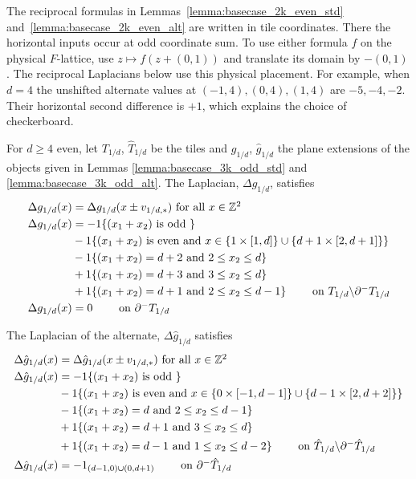 \documentclass[12pt]{amsart}
\begin{document}
The reciprocal formulas in Lemmas~\ref{lemma:basecase_2k_even_std} and~\ref{lemma:basecase_2k_even_alt} are written in tile coordinates. There the horizontal inputs occur at odd coordinate sum. To use either formula $f$ on the physical $F$-lattice, use $z\mapsto f(z+(0,1))$ and translate its domain by $-(0,1)$. The reciprocal Laplacians below use this physical placement. For example, when $d=4$ the unshifted alternate values at $(-1,4),(0,4),(1,4)$ are $-5,-4,-2$. Their horizontal second difference is $+1$, which explains the choice of checkerboard.

\begin{lemma} \label{lemma:doubled_staircase_laplacian}
	For $d \geq 4$ even, let $T_{1/d}$, $\hat{T}_{1/d}$ be the tiles and $g_{1/d}$, $\hat{g}_{1/d}$ the plane extensions of the objects given in Lemmas \ref{lemma:basecase_3k_odd_std} and \ref{lemma:basecase_3k_odd_alt}. The Laplacian, $\Delta g_{1/d}$, satisfies
	\begin{equation}
	\begin{aligned}
	\Delta g_{1/d}(x)  &=  \Delta g_{1/d}(x \pm v_{1/d, *})  \mbox{ for all $x \in \mathbb{Z}^2$} \\
	\Delta g_{1/d}(x) &= -1\{ (x_1+x_2) \mbox{ is odd } \} \\
	&  -1\{ (x_1+x_2) \mbox{ is even and $x \in \{1 \times [1,d]\} \cup \{d+1 \times [2, d+1] \}$} \} \\
	&  -1\{ (x_1 +x_2) = d+2  \mbox{ and $2 \leq x_2 \leq d$} \}\\
	&+ 1 \{ (x_1 + x_2) =d+3 \mbox{ and $3 \leq x_2 \leq d$} \} \\
	&+ 1 \{ (x_1 + x_2) =d+1 \mbox{ and $2 \leq x_2 \leq d-1$} \} \qquad \mbox{ on $T_{1/d} \backslash \partial^{-}T_{1/d}$} \\
	\Delta g_{1/d}(x) &= 0 \qquad \mbox{ on $\partial^{-}T_{1/d}$}
	\end{aligned}
	\end{equation}
	
	
	The Laplacian of the alternate, $\Delta \hat{g}_{1/d}$ satisfies 
	\begin{equation}
	\begin{aligned}
	\Delta \hat{g}_{1/d}(x)  &=  \Delta \hat{g}_{1/d}(x \pm v_{1/d, *})  \mbox{ for all $x \in \mathbb{Z}^2$} \\
	\Delta \hat{g}_{1/d}(x) &= -1\{ (x_1+x_2) \mbox{ is odd } \}\\
	&  -1\{ (x_1+x_2) \mbox{ is even and $x \in \{0 \times [-1,d-1]\} \cup \{d-1 \times [2, d+2] \}$} \} \\
	&  -1\{ (x_1 +x_2) = d  \mbox{ and $2 \leq x_2 \leq d-1$} \}\\
	&+ 1 \{ (x_1 + x_2) =d+1 \mbox{ and $3 \leq x_2 \leq d$} \} \\
	&+ 1 \{ (x_1 + x_2) =d-1 \mbox{ and $1 \leq x_2 \leq d-2$} \} \qquad \mbox{ on $\hat T_{1/d} \backslash \partial^{-}\hat T_{1/d}$} \\
	\Delta \hat{g}_{1/d}(x) &= -1_{ (d-1,0) \cup (0,d+1)} \qquad \mbox{ on $\partial^{-}\hat T_{1/d}$}
	\end{aligned}
	\end{equation}
	

\end{lemma}
\end{document}
